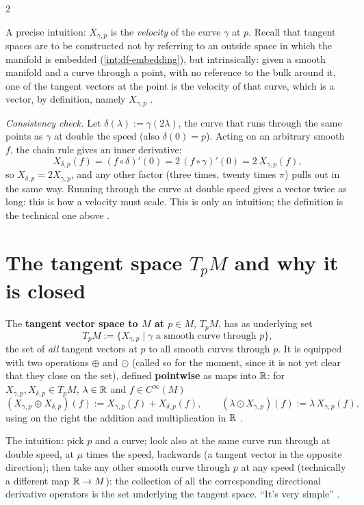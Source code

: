 \begin{paracol}{2}
\begin{intuition}\label{int:tv-velocity}
A precise intuition: $X_{\gamma,p}$ is the \emph{velocity} of the curve $\gamma$ at $p$. Recall that tangent spaces are to be constructed not by referring to an outside space in which the manifold is embedded (\cref{int:df-embedding}), but intrinsically: given a smooth
manifold and a curve through a point, with no reference to the bulk around it, one of the tangent vectors at the point is the velocity of that curve, which is a vector, by definition, namely $X_{\gamma,p}$    .
\end{intuition}
\emph{Consistency check.} Let $\delta(\lambda):=\gamma(2\lambda)$, the curve that runs through the same points as $\gamma$ at double the speed (also $\delta(0)=p$). Acting on an arbitrary smooth $f$, the chain rule gives an inner derivative:
\[
  X_{\delta,p}(f)=(f\circ\delta)'(0)=2\,(f\circ\gamma)'(0)=2\,X_{\gamma,p}(f),
\]
so $X_{\delta,p}=2X_{\gamma,p}$, and any other factor (three times, twenty times $\pi$) pulls out in the same way. Running through the curve at double speed gives a vector twice as long: this is how a velocity must scale. This is only an intuition; the definition is the technical one above
     .

\section{The tangent space $T_pM$ and why it is closed}\label{sec:tv-space}

\begin{definition}\label{def:tv-space}
The \textbf{tangent vector space to $M$ at $p\in M$}, $T_pM$, has as underlying set
\[
  T_pM:=\{X_{\gamma,p}\mid\gamma\text{ a smooth curve through }p\},
\]
the set of \emph{all} tangent vectors at $p$ to all smooth curves through $p$. It is equipped with two operations $\oplus$ and $\odot$ (called so for the moment, since it is not yet clear that they close on the set), defined \textbf{pointwise} as maps into $\mathbb{R}$: for
$X_{\gamma,p},X_{\delta,p}\in T_pM$, $\lambda\in\mathbb{R}$ and $f\in C^\infty(M)$
\[
  (X_{\gamma,p}\oplus X_{\delta,p})(f):=X_{\gamma,p}(f)+X_{\delta,p}(f),\qquad(\lambda\odot X_{\gamma,p})(f):=\lambda\,X_{\gamma,p}(f),
\]
using on the right the addition and multiplication in $\mathbb{R}$      .
\end{definition}
The intuition: pick $p$ and a curve; look also at the same curve run through at double speed, at $\mu$ times the speed, backwards (a tangent vector in the opposite direction); then take any other smooth curve through $p$ at any speed (technically a different map
$\mathbb{R}\to M$): the collection of all the corresponding directional derivative operators is the set underlying the tangent space. ``It's very simple''    .


\end{paracol}
